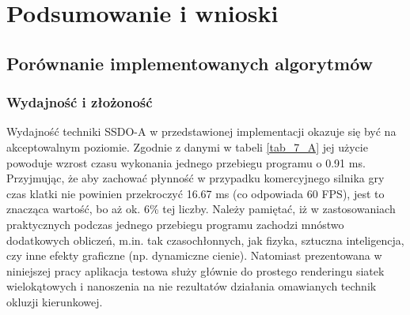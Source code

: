 \chapter{Podsumowanie i wnioski}
\label{t:wnioski}

	\section{Porównanie implementowanych algorytmów}
	\label{t:wnioski:porownanie}
	
		\subsection{Wydajność i złożoność}
		\label{t:wnioski:porownanie:wydajnosc}
		
		
		Wydajność techniki SSDO-A w przedstawionej implementacji okazuje się być na akceptowalnym poziomie. Zgodnie z danymi w tabeli \ref{tab_7_A} jej użycie powoduje wzrost czasu wykonania jednego przebiegu programu o 0.91 ms. Przyjmując, że aby zachować płynność w przypadku komercyjnego silnika gry czas klatki nie powinien przekroczyć 16.67 ms (co odpowiada 60 FPS), jest to znacząca wartość, bo aż ok. 6\% tej liczby. Należy pamiętać, iż w zastosowaniach praktycznych podczas jednego przebiegu programu zachodzi mnóstwo dodatkowych obliczeń, m.in. tak czasochłonnych, jak fizyka, sztuczna inteligencja, czy inne efekty graficzne (np. dynamiczne cienie). Natomiast prezentowana w niniejszej pracy aplikacja testowa służy głównie do prostego renderingu siatek wielokątowych i nanoszenia na nie rezultatów działania omawianych technik okluzji kierunkowej.
		
